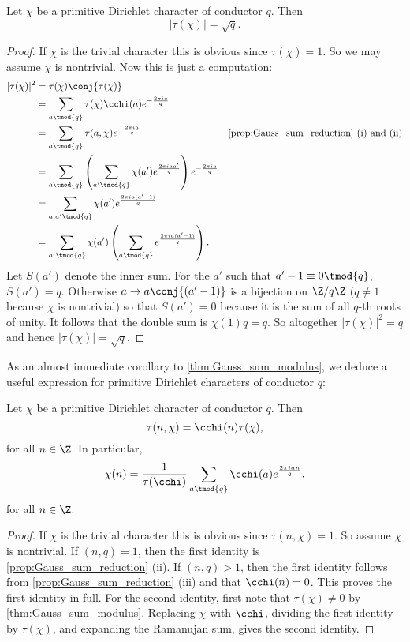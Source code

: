         \begin{theorem}\label{thm:Gauss_sum_modulus}
          Let $\chi$ be a primitive Dirichlet character of conductor $q$. Then
          \[
            |\tau(\chi)| = \sqrt{q}.
          \]
        \end{theorem}
        \begin{proof}
          If $\chi$ is the trivial character this is obvious since $\tau(\chi) = 1$. So we may assume $\chi$ is nontrivial. Now this is just a computation:
          \begin{align*}
            |\tau(\chi)|^{2} &= \tau(\chi)\conj{\tau(\chi)} \\
            &= \sum_{a \tmod{q}}\tau(\chi)\cchi(a)e^{-\frac{2\pi ia}{q}} \\
            &=  \sum_{a \tmod{q}}\tau(a,\chi)e^{-\frac{2\pi ia}{q}} & \text{\cref{prop:Gauss_sum_reduction} (i) and (ii)} \\
            &= \sum_{a \tmod{q}}\left(\sum_{a' \tmod{q}}\chi(a')e^{\frac{2\pi iaa'}{q}}\right)e^{-\frac{2\pi ia}{q}} \\
            &= \sum_{a,a' \tmod{q}}\chi(a')e^{\frac{2\pi ia(a'-1)}{q}} \\
            &= \sum_{a' \tmod{q}}\chi(a')\left(\sum_{a \tmod{q}}e^{\frac{2\pi ia(a'-1)}{q}}\right).
          \end{align*}
          Let $S(a')$ denote the inner sum. For the $a'$ such that $a'-1 \equiv 0 \tmod{q}$, $S(a') = q$. Otherwise $a \to a\conj{(a'-1)}$ is a bijection on $\Z/q\Z$ ($q \neq 1$ because $\chi$ is nontrivial) so that $S(a') = 0$ because it is the sum of all $q$-th roots of unity. It follows that the double sum is $\chi(1)q = q$. So altogether $|\tau(\chi)|^{2} = q$ and hence $|\tau(\chi)| = \sqrt{q}$.
        \end{proof}

        As an almost immediate corollary to \cref{thm:Gauss_sum_modulus}, we deduce a useful expression for primitive Dirichlet characters of conductor $q$:

        \begin{corollary}\label{cor:gauss_sum_primitive_formula}
          Let $\chi$ be a primitive Dirichlet character of conductor $q$. Then
          \[
            \tau(n,\chi) = \cchi(n)\tau(\chi),
          \]
          for all $n \in \Z$. In particular,
          \[
            \chi(n) = \frac{1}{\tau(\cchi)}\sum_{a \tmod{q}}\cchi(a)e^{\frac{2\pi ian}{q}},
          \]
          for all $n \in \Z$.
        \end{corollary}
        \begin{proof}
          If $\chi$ is the trivial character this is obvious since $\tau(n,\chi) = 1$. So assume $\chi$ is nontrivial. If $(n,q) = 1$, then the first identity is \cref{prop:Gauss_sum_reduction} (ii). If $(n,q) > 1$, then the first identity follows from \cref{prop:Gauss_sum_reduction} (iii) and that $\cchi(n) = 0$. This proves the first identity in full. For the second identity, first note that $\tau(\chi) \neq 0$ by \cref{thm:Gauss_sum_modulus}. Replacing $\chi$ with $\cchi$, dividing the first identity by $\tau(\chi)$, and expanding the Ramanujan sum, gives the second identity.
        \end{proof}


